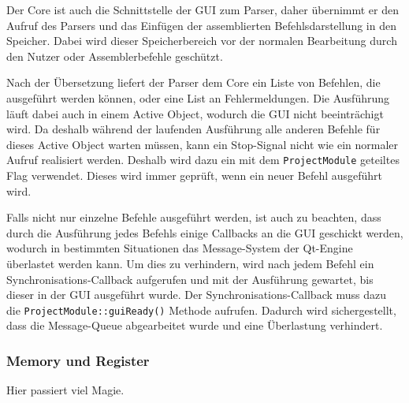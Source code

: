 Der Core ist auch die Schnittstelle der GUI zum Parser, daher übernimmt er den Aufruf des Parsers und das Einfügen der assemblierten Befehlsdarstellung in den Speicher. Dabei wird dieser Speicherbereich vor der normalen Bearbeitung durch den Nutzer oder Assemblerbefehle geschützt.

Nach der Übersetzung liefert der Parser dem Core ein Liste von Befehlen, die ausgeführt werden können, oder eine List an Fehlermeldungen. Die Ausführung läuft dabei auch in einem Active Object, wodurch die GUI nicht beeinträchigt wird. Da deshalb während der laufenden Ausführung alle anderen Befehle für dieses Active Object warten müssen, kann ein Stop-Signal nicht wie ein normaler Aufruf realisiert werden. Deshalb wird dazu ein mit dem \texttt{ProjectModule} geteiltes Flag verwendet. Dieses wird immer geprüft, wenn ein neuer Befehl ausgeführt wird.

Falls nicht nur einzelne Befehle ausgeführt werden, ist auch zu beachten, dass durch die Ausführung jedes Befehls einige Callbacks an die GUI geschickt werden, wodurch in bestimmten Situationen das Message-System der Qt-Engine überlastet werden kann. Um dies zu verhindern, wird nach jedem Befehl ein Synchronisations-Callback aufgerufen und mit der Ausführung gewartet, bis dieser in der GUI ausgeführt wurde. Der Synchronisations-Callback muss dazu die \texttt{ProjectModule::guiReady()} Methode aufrufen. Dadurch wird sichergestellt, dass die Message-Queue abgearbeitet wurde und eine Überlastung verhindert.

\subsubsection{Memory und Register}

Hier passiert viel Magie.
